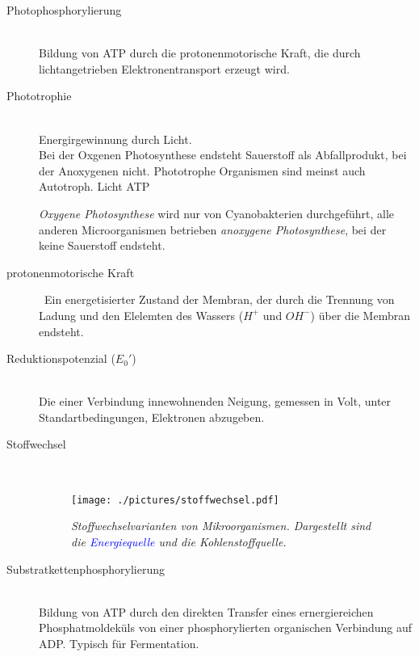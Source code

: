 \begin{description}
	\item[Photophosphorylierung] \hfill \\
		Bildung von ATP durch die protonenmotorische Kraft,
		die durch lichtangetrieben Elektronentransport erzeugt wird.

	\item[Phototrophie]\hfill \\
		Energirgewinnung durch Licht.\\
		Bei der Oxgenen Photosynthese endsteht Sauerstoff als Abfallprodukt,
		bei der Anoxygenen nicht.
		Phototrophe Organismen sind meinst auch Autotroph.
		Licht \textrightarrow ATP

		\emph{Oxygene Photosynthese} wird nur von Cyanobakterien durchgeführt,
		alle anderen Microorganismen betrieben \emph{anoxygene Photosynthese},
		bei der keine Sauerstoff endsteht.

	\item[protonenmotorische Kraft] 	\hfill	\
		Ein energetisierter Zustand der Membran,
		der durch die Trennung von Ladung und den Elelemten des Wassers
		($H^+$ und  $OH^-$) über die Membran endsteht.

	\item[Reduktionspotenzial ($E_0'$)] \hfill \\
		Die einer Verbindung innewohnenden Neigung,
		gemessen in Volt,
		unter Standartbedingungen,
		Elektronen abzugeben.

	 \item[Stoffwechsel] \hfill \\

		\begin{figure}[ht!]
		\leavevmode
		\begin{center}
		\texttt{[image: ./pictures/stoffwechsel.pdf]}
		\end{center}
		\caption{\slshape{Stoffwechselvarianten von Mikroorganismen.
								Dargestellt sind die \textcolor{blue}{Energiequelle} und die Kohlenstoffquelle.}}
		\label{fig:Stoffwechselvarianten}
		\end{figure}

	\item[Substratkettenphosphorylierung]	\hfill	\\
		Bildung von ATP durch den direkten Transfer eines ernergiereichen
		Phosphatmoldeküls von einer phosphorylierten organischen Verbindung
		auf ADP.
		Typisch für Fermentation.
\end{description}
